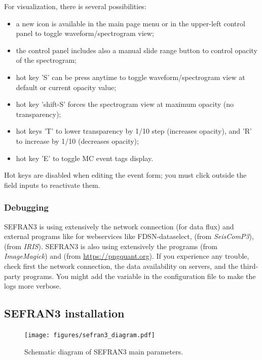 For visualization, there is several possibilities:
\begin{itemize}
\item a new icon is available in the main page menu or in the upper-left control panel to toggle waveform/spectrogram view;
\item the control panel includes also a manual slide range button to control opacity of the spectrogram;
\item hot key 'S' can be press anytime to toggle waveform/spectrogram view at default or current opacity value;
\item hot key 'shift-S' forces the spectrogram view at maximum opacity (no transparency);
\item hot keys 'T' to lower transparency by 1/10 step (increases opacity), and 'R' to increase by 1/10 (decreases opacity);
\item hot key 'E' to toggle MC event tags display.
\end{itemize}
Hot keys are disabled when editing the event form; you must click outside the field inputs to reactivate them.


\subsubsection{Debugging}

SEFRAN3 is using extensively the network connection (for data flux) and external programs like  for webservices like FDSN-dataselect,  (from \textit{SeisComP3}),  (from \textit{IRIS}). SEFRAN3 is also using extensively the programs  (from \textit{ImageMagick}) and  (from \url{https://pngquant.org}). If you experience any trouble, check first the network connection, the data availability on servers, and the third-party programs. You might add the variable  in the configuration file to make the logs more verbose.

\subsection{SEFRAN3 installation}


\begin{figure}
\texttt{[image: figures/sefran3\_diagram.pdf]}
\caption{Schematic diagram of SEFRAN3 main parameters.}
\label{sefran3_diagram}
\end{figure}



